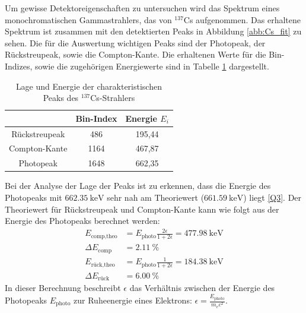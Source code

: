 Um gewisse Detektoreigenschaften zu untersuchen wird das Spektrum eines monochromatischen Gammastrahlers, das von $^{137}$Cs aufgenommen. Das erhaltene Spektrum ist zusammen mit den detektierten Peaks in Abbildung \ref{abb:Cs_fit} zu sehen. Die für die Auswertung wichtigen Peaks sind der Photopeak, der Rückstreupeak, sowie die Compton-Kante. Die erhaltenen Werte für die Bin-Indizes, sowie die zugehörigen Energiewerte sind in Tabelle \ref{tab:Cs_peaks} dargestellt.
\FloatBarrier
\begin{table}
    \centering
    \caption{Lage und Energie der charakteristischen Peaks des $^{137}$Cs-Strahlers}
    \label{tab:Cs_peaks}
    \begin{tabular}{ c c c }
        \toprule
        & {Bin-Index} & {Energie $E_i$}      \\
        \midrule
        {Rückstreupeak} & 486  & 195,44      \\
        {Compton-Kante} & 1164 & 467,87      \\
        {Photopeak}     & 1648 & 662,35      \\
        \bottomrule
    \end{tabular}
\end{table}
\FloatBarrier
Bei der Analyse der Lage der Peaks ist zu erkennen, dass die Energie des Photopeaks mit $\SI{662,35}{\kilo \electronvolt}$ sehr nah am Theoriewert ($\SI{661,59}{\kilo \electronvolt}$) liegt \ref{Q3}.
Der Theoriewert für Rückstreupeak und Compton-Kante kann wie folgt aus der Energie des Photopeaks berechnet werden:
\begin{align*}
    E_{\text{comp,theo}} &= E_\text{photo} \frac{2\epsilon}{1+2\epsilon} = \SI{477,98}{\kilo\electronvolt} \\ \Delta E_\text{comp} &= \SI{2,11}{\percent} \\
    E_{\text{rück,theo}} &= E_\text{photo} \frac{1}{1+2\epsilon} = \SI{184,38}{\kilo\electronvolt} \\
    \Delta E_\text{rück} &= \SI{6,00}{\percent}
\end{align*}
In dieser Berechnung beschreibt $\epsilon$ das Verhältnis zwischen der Energie des Photopeaks $E_\text{photo}$ zur Ruheenergie eines Elektrons: $\epsilon = \frac{E_\text{photo}}{m_e c^2}$.

